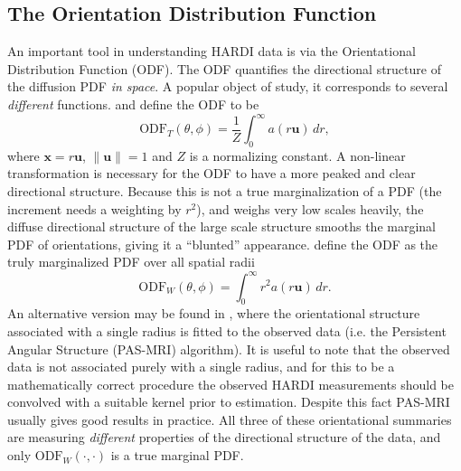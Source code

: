 \documentclass[dvips,aoas,preprint]{imsart}
\numberwithin{equation}{section}
\theoremstyle{plain}
\newcommand{\uu}{\mathbf{u}}
\newcommand{\x}{\mathbf{x}}
\begin{document}
\subsection{The Orientation Distribution Function}

An important tool in understanding HARDI data is via the Orientational
Distribution Function (ODF).  The ODF quantifies the directional
structure of the diffusion PDF {\em in space}.  A popular object of
study, it corresponds to several {\em different} functions.
\citet{Tuch} and \citet{Hess,Descoteaux} define the ODF to be
\begin{equation}
  \text{ODF}_T(\theta,\phi) = \frac{1}{Z} \int_0^{\infty} a(r\uu)\,dr,
\end{equation}
where $\x=r\uu$, $\|\uu\|=1$ and $Z$ is a normalizing constant.  A
non-linear transformation is necessary for the ODF to have a more
peaked and clear directional structure.  Because this is not a true
marginalization of a PDF (the increment needs a weighting by $r^2$), and weighs very low scales heavily, the
diffuse directional structure of the large scale structure smooths the
marginal PDF of orientations, giving it a ``blunted'' appearance.
\citet{Wedeen05} define the ODF as the truly marginalized PDF over all
spatial radii 
\[\text{ODF}_W(\theta,\phi)=\int_0^{\infty}r^2a(r\uu)\,dr.\]  An
alternative version may be found in \citep{Jansons}, where the
orientational structure associated with a single radius is fitted to
the observed data (i.e. the Persistent Angular Structure (PAS-MRI)
algorithm).  It is useful to note that the observed data is not
associated purely with a single radius, and for this to be a
mathematically correct procedure the observed HARDI measurements
should be convolved with a suitable kernel prior to estimation.
Despite this fact PAS-MRI usually gives good results in practice.  All three
of these orientational summaries are measuring {\em different} properties of
the directional structure of the data, and only
$\text{ODF}_W(\cdot,\cdot)$ is a true marginal PDF.
\end{document}
